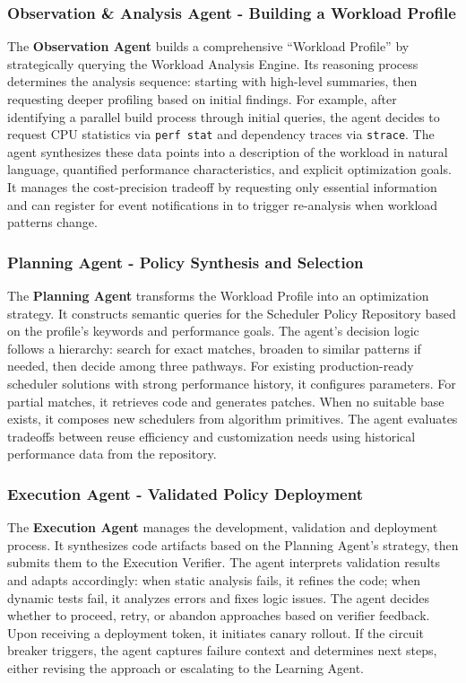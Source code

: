 \subsubsection{Observation \& Analysis Agent - Building a Workload Profile}

The \textbf{Observation Agent} builds a comprehensive ``Workload Profile'' by strategically querying the Workload Analysis Engine. Its reasoning process determines the analysis sequence: starting with high-level summaries, then requesting deeper profiling based on initial findings. For example, after identifying a parallel build process through initial queries, the agent decides to request CPU statistics via \texttt{perf stat} and dependency traces via \texttt{strace}. The agent synthesizes these data points into a description of the workload in natural language, quantified performance characteristics, and explicit optimization goals. It manages the cost-precision tradeoff by requesting only essential information and can register for event notifications in \sys to trigger re-analysis when workload patterns change.

\subsubsection{Planning Agent - Policy Synthesis and Selection}

The \textbf{Planning Agent} transforms the Workload Profile into an optimization strategy. It constructs semantic queries for the Scheduler Policy Repository based on the profile's keywords and performance goals. The agent's decision logic follows a hierarchy: search for exact matches, broaden to similar patterns if needed, then decide among three pathways. For existing production-ready scheduler solutions with strong performance history, it configures parameters. For partial matches, it retrieves code and generates patches. When no suitable base exists, it composes new schedulers from algorithm primitives. The agent evaluates tradeoffs between reuse efficiency and customization needs using historical performance data from the repository.

\subsubsection{Execution Agent - Validated Policy Deployment}

The \textbf{Execution Agent} manages the development, validation and deployment process. It synthesizes code artifacts based on the Planning Agent's strategy, then submits them to the Execution Verifier. The agent interprets validation results and adapts accordingly: when static analysis fails, it refines the code; when dynamic tests fail, it analyzes errors and fixes logic issues. The agent decides whether to proceed, retry, or abandon approaches based on verifier feedback. Upon receiving a deployment token, it initiates canary rollout. If the circuit breaker triggers, the agent captures failure context and determines next steps, either revising the approach or escalating to the Learning Agent.

